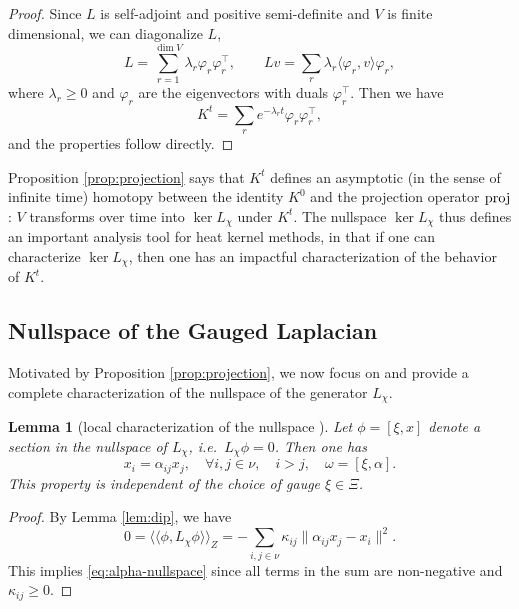 \documentclass[10pt,reqno]{amsart}
\numberwithin{equation}{section}
\theoremstyle{bfnote}
\newtheorem{lemma}[theorem]{Lemma}
\theoremstyle{bfdef}
\newcommand{\la}{\langle}
\newcommand{\ra}{\rangle}
\newcommand{\lla}{\langle\langle}
\newcommand{\rra}{\rangle\rangle}
\providecommand\x; %
\renewcommand{\x}{x}
\providecommand\gt; %
\renewcommand{\gt}{\xi}
\providecommand\a; %
\renewcommand{\a}{\alpha}
\providecommand\hgen; %
\renewcommand{\hgen}{L}
\providecommand\vg; %
\renewcommand{\vg}{\chi}
\begin{document}
	\begin{proof}
		Since $\hgen$ is self-adjoint and positive semi-definite and $V$ is finite dimensional, we can diagonalize $\hgen$,
		\begin{equation}
			\hgen = \sum_{r = 1}^{\dim V} \lambda_r \varphi_r \varphi^\top_r, \qquad
			\hgen v = \sum_r \lambda_r \la \varphi_r,v \ra \varphi_r,
		\end{equation}
		where $\lambda_r \geq 0$ and $\varphi_r$ are the eigenvectors with duals $\varphi_r^{\top}$.
		Then we have
		\begin{equation}
			K^t = \sum_r e^{-\lambda_r t} \varphi_r \varphi^\top_r,
		\end{equation}
		and the properties follow directly.
	\end{proof}
	Proposition \ref{prop:projection} says that $K^t$ defines an asymptotic (in the sense of infinite time) homotopy between the identity $K^0$ and the projection operator $\rm{proj}$: $V$ transforms over time into $\ker L_{\chi}$ under $K^t$. The nullspace $\ker \hgen_{\vg}$ thus defines an important analysis tool for heat kernel methods, in that if one can characterize $\ker \hgen_{\vg}$, then one has an impactful characterization of the behavior of $K^t$.

	\subsection{Nullspace of the Gauged Laplacian}
		Motivated by Proposition \ref{prop:projection}, we now focus on and provide a complete characterization of the nullspace of the generator $\hgen_{\vg}$.

		\begin{lemma}[{local characterization of the nullspace \cite[Proposition 2.3]{gaoGeometrySynchronizationProblems2019}}]\label{lem:loc-desc}
			Let $\phi = [\gt,\x ]$ denote a section in the nullspace of $\hgen_{\vg}$, i.e.~$\hgen_{\vg} \phi = 0$. Then one has
			\begin{equation}\label{eq:alpha-nullspace}
				\x_i = \a_{ij} \x_{j}, \quad \forall i, j \in \nu, \quad i > j, \quad \omega = [\gt,\a].
			\end{equation}
			This property is independent of the choice of gauge $\xi \in \Xi$.
	  \end{lemma}

		\begin{proof}
			By Lemma \ref{lem:dip}, we have
			\begin{equation}
			  0 = \lla \phi, \hgen_{\vg} \phi \rra_{Z} = - \sum_{i ,j \in \nu} \kappa_{ij} \| \a_{ij} \x_{j} - \x_{i} \|^{2}.
			\end{equation}
			This implies \eqref{eq:alpha-nullspace} since all terms in the sum are non-negative and $\kappa_{ij} \geq 0$.
		\end{proof}
\end{document}
